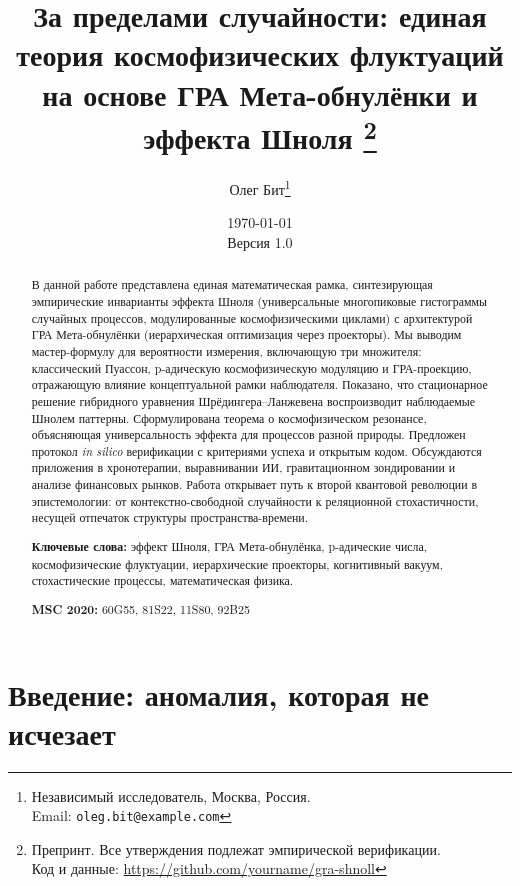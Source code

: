 \documentclass[12pt,a4paper]{article}
\title{
    \textbf{За пределами случайности: единая теория космофизических флуктуаций \\ на основе ГРА Мета-обнулёнки и эффекта Шноля}
    \thanks{Препринт. Все утверждения подлежат эмпирической верификации. \\
    Код и данные: \url{https://github.com/yourname/gra-shnoll}}
}
\author{
    Олег Бит\thanks{Независимый исследователь, Москва, Россия. \\
    Email: \texttt{oleg.bit@example.com}}
}
\date{
    \today \\
    \small{Версия 1.0}
}
\theoremstyle{plain}
\theoremstyle{definition}
\theoremstyle{remark}
\begin{document}
\maketitle

\begin{abstract}
\noindent
В данной работе представлена единая математическая рамка, синтезирующая эмпирические инварианты эффекта Шноля (универсальные многопиковые гистограммы случайных процессов, модулированные космофизическими циклами) с архитектурой ГРА Мета-обнулёнки (иерархическая оптимизация через проекторы). Мы выводим мастер-формулу для вероятности измерения, включающую три множителя: классический Пуассон, p-адическую космофизическую модуляцию и ГРА-проекцию, отражающую влияние концептуальной рамки наблюдателя. Показано, что стационарное решение гибридного уравнения Шрёдингера--Ланжевена воспроизводит наблюдаемые Шнолем паттерны. Сформулирована теорема о космофизическом резонансе, объясняющая универсальность эффекта для процессов разной природы. Предложен протокол \textit{in silico} верификации с критериями успеха и открытым кодом. Обсуждаются приложения в хронотерапии, выравнивании ИИ, гравитационном зондировании и анализе финансовых рынков. Работа открывает путь к второй квантовой революции в эпистемологии: от контекстно-свободной случайности к реляционной стохастичности, несущей отпечаток структуры пространства-времени.

\medskip
\noindent\textbf{Ключевые слова:} эффект Шноля, ГРА Мета-обнулёнка, p-адические числа, космофизические флуктуации, иерархические проекторы, когнитивный вакуум, стохастические процессы, математическая физика.

\medskip
\noindent\textbf{MSC 2020:} 60G55, 81S22, 11S80, 92B25
\end{abstract}

\section{Введение: аномалия, которая не исчезает}
\label{sec:intro}
\end{document}
